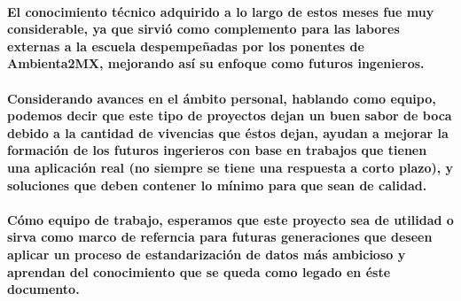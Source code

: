   \paragraph{El conocimiento técnico adquirido a lo largo de estos meses fue muy considerable, ya que sirvió como complemento para las labores externas a la escuela despempeñadas por los ponentes de Ambienta2MX, mejorando así su enfoque como futuros ingenieros.}
  \paragraph{Considerando avances en el ámbito personal, hablando como equipo, podemos decir que este tipo de proyectos dejan un buen sabor de boca debido a la cantidad de vivencias que éstos dejan, ayudan a mejorar la formación de los futuros ingerieros con base en trabajos que tienen una aplicación real (no siempre se tiene una respuesta a corto plazo), y soluciones que deben contener lo mínimo para que sean de calidad.}
  \paragraph{Cómo equipo de trabajo, esperamos que este proyecto sea de utilidad o sirva como marco de referncia para futuras generaciones que deseen aplicar un proceso de estandarización de datos más ambicioso y aprendan del conocimiento que se queda como legado en éste documento.}
